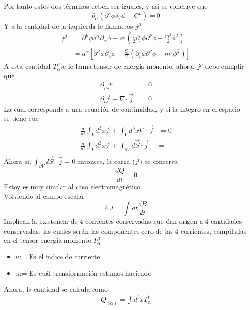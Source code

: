 \documentclass[../main.tex]{subfiles}
\begin{document}
Por tanto estos dos términos deben ser iguales, y así se concluye que
\begin{equation*}
  \partial_\mu \left( \partial^\mu \phi \delta_T\phi - C^\mu \right) = 0
\end{equation*}
Y a la cantidad de la izquierda le llamaeros $j^\mu$
\begin{align*}
  j^\mu & = \partial^\mu \phi a^\alpha \partial_\alpha \phi - a^\mu \left( \frac{1}{2}\partial_\nu \phi \partial^\nu \phi - \frac{m^2}{2}\phi^2 \right) \\
  & = a^\alpha \left[ \partial^\mu \phi \partial_\alpha \phi - \frac{\delta_\alpha^\mu}{2}\left( \partial_\nu \phi \partial^\nu \phi - m^2\phi^2 \right) \right]
\end{align*}
A esta cantidad $T^\mu_\alpha $se le llama tensor de energía-monento, ahora, $j^\mu$ debe cumplir que
\begin{align*}
  \partial_\mu j^\mu & = 0 \\
  \partial_tj^t + \nabla \cdot \vec{j} & = 0
\end{align*}
La cual corresponde a una ecuación de continuidad, y si la integro en el espacio se tiene que
\begin{align*}
  \frac{d}{dt}\int_V d^3xj^t + \int_V d^3x\nabla \cdot \vec{j} & = 0 \\
  \frac{d}{dt}\int_V d^3x j^t + \int_{\partial V}d\vec{S}\cdot \vec{j} & = \\
\end{align*}
Ahora si, $\int_{\partial V}d\vec{S}\cdot \vec{j}=0$ entonces, la carga ($j^t$) se conserva 
\begin{equation*}
  \frac{dQ}{dt} = 0
\end{equation*}
Estoy es muy similar al caso electromagnético. \\
Volviendo al campo escalar
\begin{equation*}
  \delta_T I = \int dt\frac{dB}{dt}
\end{equation*}
Implican la existencia de 4 corrientes conservadas que dan origen a 4 cantidades conservadas. las cuales serán las componentes cero de las 4 corrientes, compiladas en el tensor energía momento $T_\alpha^\mu$
\begin{itemize}
  \item $\mu$:= Es el índice de corriente
  \item $\alpha$:= Es cuál transformación estamos haciendo 
\end{itemize}
Ahora, la cantidad se calcula como 
\begin{align*}
  Q_{(\alpha)}  = \int d^3x T^t_\alpha
\end{align*}
\end{document}
